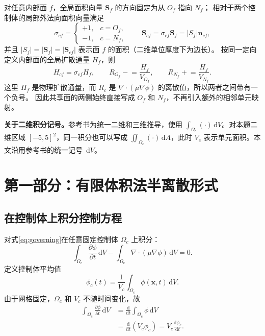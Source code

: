 \documentclass[UTF8,12pt,a4paper]{ctexart}
\numberwithin{equation}{section}
\newcommand{\dd}{\,\mathrm d}
\newcommand{\Sf}{\bm S}
\newcommand{\xf}{\bm x}
\begin{document}
对任意内部面 $f$，全局面积向量 $\Sf_f$ 的方向固定为从 $O_f$ 指向 $N_f$；
相对于两个控制体的局部外法向面积向量满足
\begin{equation}
  \boxed{
  \sigma_{cf}=
  \begin{cases}
    +1,&c=O_f,\\
    -1,&c=N_f,
  \end{cases}
  \qquad
  \Sf_{cf}=\sigma_{cf}\Sf_f=|S_f|\bm n_{cf}},
  \label{eq:local_global_area_vectors}
\end{equation}
并且 $|S_f|=|\Sf_f|=|\Sf_{cf}|$ 表示面 $f$ 的面积（二维单位厚度下为边长）。
按同一定向定义内部面的全局扩散通量 $H_f$，则
\begin{equation}
  \boxed{
  H_{cf}=\sigma_{cf}H_f,
  \qquad
  R_{O_f}\mathrel{-}=\frac{H_f}{V_{O_f}},
  \qquad
  R_{N_f}\mathrel{+}=\frac{H_f}{V_{N_f}}.}
  \label{eq:global_face_assembly}
\end{equation}
这里 $H_f$ 是物理扩散通量，而 $R_c$ 是
$\nabla\cdot(\mu\nabla\phi)$ 的离散值，所以两者之间带有一个负号。
因此共享面的两侧始终直接写成 $O_f$ 和 $N_f$，不再引入额外的相邻单元映射。

\noindent\textbf{关于二维积分记号。}参考书为统一二维和三维推导，使用 $\int_{\Omega_c}(\cdot)\dd V$。对本题二维区域 $[-5,5]^2$，同一积分也可以写成 $\iint_{\Omega_c}(\cdot)\dd A$，此时 $V_c$ 表示单元面积。本文沿用参考书的统一记号 $\dd V$。

\newpage
\section{第一部分：有限体积法半离散形式}

\subsection{在控制体上积分控制方程}

对式\eqref{eq:governing}在任意固定控制体 $\Omega_c$ 上积分：
\begin{equation}
  \int_{\Omega_c}\frac{\partial\phi}{\partial t}\dd V
  -\int_{\Omega_c}\nabla\cdot(\mu\nabla\phi)\dd V=0.
  \label{eq:cell_integrated}
\end{equation}
定义控制体平均值
\begin{equation}
  \phi_c(t)
  =\frac{1}{V_c}\int_{\Omega_c}\phi(\xf,t)\dd V.
  \label{eq:cell_average}
\end{equation}
由于网格固定，$\Omega_c$ 和 $V_c$ 不随时间变化，故
\begin{align}
  \int_{\Omega_c}\frac{\partial\phi}{\partial t}\dd V
  &=\frac{\mathrm d}{\mathrm dt}
    \int_{\Omega_c}\phi\dd V
    \label{eq:time_interchange}\\
  &=\frac{\mathrm d}{\mathrm dt}(V_c\phi_c)
   =V_c\frac{\mathrm d\phi_c}{\mathrm dt}.
  \label{eq:time_term_cell}
\end{align}
\end{document}
